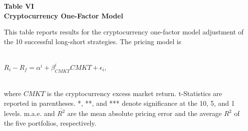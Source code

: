 \documentclass{article}
\begin{document}
    \begin{center}
        \textbf{
        Table VI
        \\
        Cryptocurrency One-Factor Model
        }
    \end{center}
    \begin{justify}
        \footnotesize{
            This table reports results for the cryptocurrency one-factor model adjustment of the 10 successful long-short strategies. The pricing model is
        }
        \\
        \\
        \footnotesize{
            \centerline{
                $R_i-R_f=\alpha^i+\beta^i_{CMKT}CMKT+\epsilon_i$,
            }
        }
        \\
        \footnotesize{
            where $CMKT$ is the cryptocurrency excess market return. t-Statistics are reported in parentheses. *, **, and *** denote significance at the 10, 5, and 1 levels. m.a.e. and $\overline{R^2}$ are the mean absolute pricing error and the average $R^2$ of the five portfolios, respectively.
        }
    \end{justify}
    \-
\end{document}
